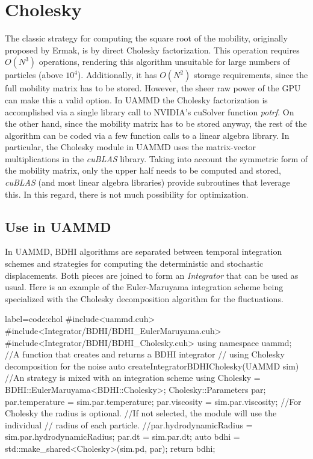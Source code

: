 \documentclass[ twoside,openright,titlepage,numbers=noenddot,%
headinclude,footinclude,cleardoublepage=empty,abstract=on,
BCOR=5mm,paper=a4,fontsize=11pt, dvipsnames
]{scrreprt}
\newcommand{\uammd}{\gls{UAMMD}\xspace}
\newcommand{\gpu}{\gls{GPU}\xspace}
\begin{document}
\section{Cholesky}\label{sec:chol}
The classic strategy for computing the square root of the mobility, originally proposed by Ermak\cite{Ermak1978}, is by direct Cholesky factorization. This operation requires $O(N^3)$ operations, rendering this algorithm unsuitable for large numbers of particles (above $10^4$). Additionally, it has $O(N^2)$ storage requirements, since the full mobility matrix has to be stored.
However, the sheer raw power of the \gpu can make this a valid option. In \uammd the Cholesky factorization is accomplished via a single library call to NVIDIA's cuSolver function \emph{potrf}\cite{cusolver}.
On the other hand, since the mobility matrix has to be stored anyway, the rest of the algorithm can be coded via a few function calls to a linear algebra library. In particular, the Cholesky module in \uammd uses the matrix-vector multiplications in the \emph{cuBLAS} library\cite{cublas}. Taking into account the symmetric form of the mobility matrix, only the upper half needs to be computed and stored, \emph{cuBLAS} (and most linear algebra libraries) provide subroutines that leverage this. In this regard, there is not much possibility for optimization.

\subsection*{Use in UAMMD}\label{sec:uammdchol}
In \uammd, \gls{BDHI} algorithms are separated between temporal integration schemes and strategies for computing the deterministic and stochastic displacements. Both pieces are joined to form an \emph{Integrator} that can be used as usual.
Here is an example of the Euler-Maruyama integration scheme being specialized with the Cholesky decomposition algorithm for the fluctuations.
\begin{code2}{label=code:chol}
#include<uammd.cuh>
#include<Integrator/BDHI/BDHI_EulerMaruyama.cuh>
#include<Integrator/BDHI/BDHI_Cholesky.cuh>
using namespace uammd;
//A function that creates and returns a BDHI integrator
// using Cholesky decomposition for the noise
auto createIntegratorBDHICholesky(UAMMD sim){   
  //An strategy is mixed with an integration scheme
  using Cholesky = BDHI::EulerMaruyama<BDHI::Cholesky>;
  Cholesky::Parameters par;
  par.temperature = sim.par.temperature;
  par.viscosity = sim.par.viscosity;
  //For Cholesky the radius is optional.
  //If not selected, the module will use the individual 
  //  radius of each particle.
  //par.hydrodynamicRadius = sim.par.hydrodynamicRadius;
  par.dt = sim.par.dt;
  auto bdhi = std::make_shared<Cholesky>(sim.pd, par);
  return bdhi;
}
\end{code2}
\end{document}
